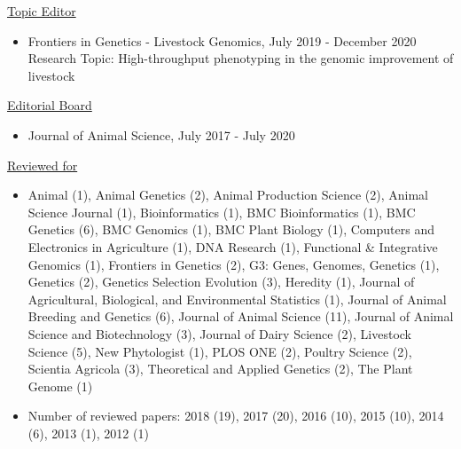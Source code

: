 \documentclass[margin,line,10pt]{res}
\newenvironment{list1}{
  \begin{list}{\ding{113}}{%
      \setlength{\itemsep}{0in}
      \setlength{\parsep}{0in} \setlength{\parskip}{0in}
      \setlength{\topsep}{0in} \setlength{\partopsep}{0in} 
      \setlength{\leftmargin}{0.17in}}}{\end{list}}
\begin{document}
\begin{resume}
\underline{Topic Editor}
\begin{itemize}
\item Frontiers in Genetics - Livestock Genomics, July 2019 - December 2020 \\
  Research Topic: High-throughput phenotyping in the genomic improvement of livestock
\end{itemize}
\vspace{0.3cm}

\underline{Editorial Board}
 \vspace{.3cm}
\begin{itemize}
\item Journal of Animal Science, July 2017 - July 2020 
\end{itemize}
  
\vspace{0.3cm}
\underline{Reviewed for}
\begin{itemize}
    \vspace{.1cm}
\item Animal (1), Animal Genetics (2), Animal Production Science (2), Animal Science Journal (1), Bioinformatics (1), BMC Bioinformatics (1), BMC Genetics (6), BMC Genomics (1), BMC Plant Biology (1), Computers and Electronics in Agriculture (1), DNA Research (1), Functional \& Integrative Genomics (1), Frontiers in Genetics (2), G3: Genes, Genomes, Genetics (1), Genetics (2), Genetics Selection Evolution (3), Heredity (1), Journal of Agricultural, Biological, and Environmental Statistics (1), Journal of Animal Breeding and Genetics (6), Journal of Animal Science (11), Journal of Animal Science and Biotechnology (3), Journal of Dairy Science (2), Livestock Science (5), New Phytologist (1), PLOS ONE (2), Poultry Science (2), Scientia Agricola (3), Theoretical and Applied Genetics (2), The Plant Genome (1) 
  \vspace{.1cm}
  \item Number of reviewed papers: 2018 (19), 2017 (20), 2016 (10), 2015 (10), 2014 (6), 2013 (1), 2012 (1)
\end{itemize}


\begin{comment}
\vspace{0.5cm}
\section{\sc Manuscripts under review}

\begin{list1}


\end{comment}
\end{resume}
\end{document}
